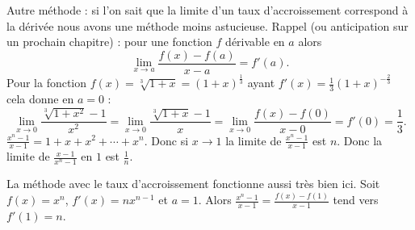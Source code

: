 {{Autre méthode : si l'on sait que la limite d'un taux d'accroissement correspond à la dérivée nous avons une méthode moins
astucieuse. Rappel (ou anticipation sur un prochain chapitre) : pour une fonction $f$ dérivable en $a$ alors
$$\lim_{x\to a} \frac{f(x)-f(a)}{x-a} = f'(a).$$
Pour la fonction $f(x) = \sqrt[3]{1+x} =(1+x)^{\frac 13}$ ayant $f'(x) = \frac 13 (1+x)^{-\frac 23}$ cela donne en $a=0$ :
$$\lim_{x\to 0} \frac{\sqrt[3]{1+x^2} -1}{x^2} = \lim_{x\to 0} \frac{\sqrt[3]{1+x} -1}{x} = \lim_{x\to 0} \frac{f(x)-f(0)}{x-0} = f'(0) = \frac 13.$$
$\frac{x^n-1}{x-1} = 1+x+x^2+\cdots + x^n$. Donc si $x\to 1$ la limite de  $\frac{x^n-1}{x-1}$ est  $n$.
Donc la limite de $\frac{x-1}{x^n-1}$ en $1$ est $\frac 1n$.

La méthode avec le taux d'accroissement fonctionne aussi très bien ici. Soit $f(x) = x^n$, $f'(x)=nx^{n-1}$ et $a=1$.
Alors $\frac{x^n-1}{x-1} = \frac{f(x)-f(1)}{x-1}$ tend vers $f'(1)=n$.
}
}
